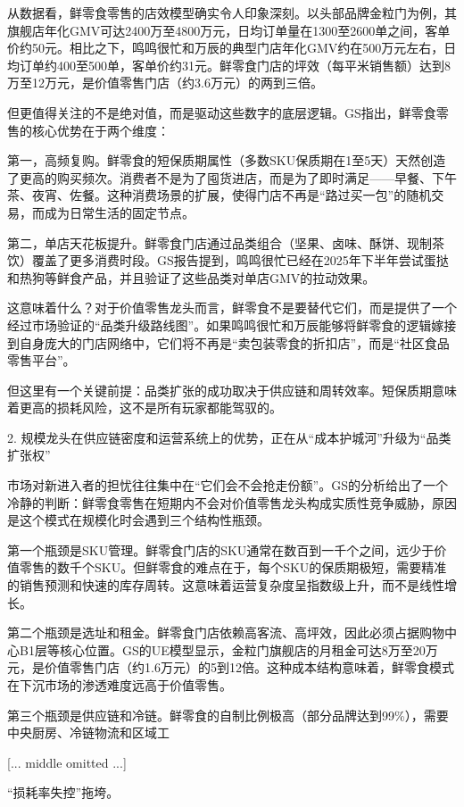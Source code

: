 \documentclass[11pt]{ctexart}
\begin{document}
从数据看，鲜零食零售的店效模型确实令人印象深刻。以头部品牌金粒门为例，其旗舰店年化GMV可达2400万至4800万元，日均订单量在1300至2600单之间，客单价约50元。相比之下，鸣鸣很忙和万辰的典型门店年化GMV约在500万元左右，日均订单约400至500单，客单价约31元。鲜零食门店的坪效（每平米销售额）达到8万至12万元，是价值零售门店（约3.6万元）的两到三倍。

但更值得关注的不是绝对值，而是驱动这些数字的底层逻辑。GS指出，鲜零食零售的核心优势在于两个维度：

第一，高频复购。鲜零食的短保质期属性（多数SKU保质期在1至5天）天然创造了更高的购买频次。消费者不是为了囤货进店，而是为了即时满足——早餐、下午茶、夜宵、佐餐。这种消费场景的扩展，使得门店不再是“路过买一包”的随机交易，而成为日常生活的固定节点。

第二，单店天花板提升。鲜零食门店通过品类组合（坚果、卤味、酥饼、现制茶饮）覆盖了更多消费时段。GS报告提到，鸣鸣很忙已经在2025年下半年尝试蛋挞和热狗等鲜食产品，并且验证了这些品类对单店GMV的拉动效果。

这意味着什么？对于价值零售龙头而言，鲜零食不是要替代它们，而是提供了一个经过市场验证的“品类升级路线图”。如果鸣鸣很忙和万辰能够将鲜零食的逻辑嫁接到自身庞大的门店网络中，它们将不再是“卖包装零食的折扣店”，而是“社区食品零售平台”。

但这里有一个关键前提：品类扩张的成功取决于供应链和周转效率。短保质期意味着更高的损耗风险，这不是所有玩家都能驾驭的。

2. 规模龙头在供应链密度和运营系统上的优势，正在从“成本护城河”升级为“品类扩张权”

市场对新进入者的担忧往往集中在“它们会不会抢走份额”。GS的分析给出了一个冷静的判断：鲜零食零售在短期内不会对价值零售龙头构成实质性竞争威胁，原因是这个模式在规模化时会遇到三个结构性瓶颈。

第一个瓶颈是SKU管理。鲜零食门店的SKU通常在数百到一千个之间，远少于价值零售的数千个SKU。但鲜零食的难点在于，每个SKU的保质期极短，需要精准的销售预测和快速的库存周转。这意味着运营复杂度呈指数级上升，而不是线性增长。

第二个瓶颈是选址和租金。鲜零食门店依赖高客流、高坪效，因此必须占据购物中心B1层等核心位置。GS的UE模型显示，金粒门旗舰店的月租金可达8万至20万元，是价值零售门店（约1.6万元）的5到12倍。这种成本结构意味着，鲜零食模式在下沉市场的渗透难度远高于价值零售。

第三个瓶颈是供应链和冷链。鲜零食的自制比例极高（部分品牌达到99\%），需要中央厨房、冷链物流和区域工

[... middle omitted ...]

“损耗率失控”拖垮。
\end{document}
